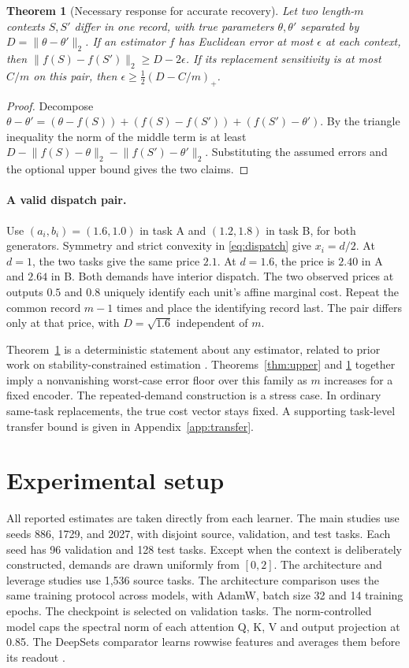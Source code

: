 \documentclass[11pt,letterpaper]{article}
\newtheorem{theorem}{Theorem}
\newcommand{\norm}[1]{\lVert #1\rVert_2}
\begin{document}
\begin{theorem}[Necessary response for accurate recovery]
\label{thm:lower}
Let two length-\(m\) contexts \(S,S'\) differ in one record, with true
parameters \(\theta,\theta'\) separated by \(D=\norm{\theta-\theta'}\).
If an estimator \(f\) has Euclidean error at most \(\epsilon\) at each
context, then \(\norm{f(S)-f(S')}\ge D-2\epsilon\). If its
replacement sensitivity is at most \(C/m\) on this pair, then
\(\epsilon\ge \tfrac12(D-C/m)_+\).
\end{theorem}
\begin{proof}
Decompose \(\theta-\theta'=(\theta-f(S))+(f(S)-f(S'))+
(f(S')-\theta')\). By the triangle inequality the norm of the middle
term is at least \(D-\norm{f(S)-\theta}-\norm{f(S')-\theta'}\).
Substituting the assumed errors and the optional upper bound gives
the two claims.
\end{proof}

\paragraph{A valid dispatch pair.}
Use \((a_i,b_i)=(1.6,1.0)\) in task A and \((1.2,1.8)\) in task B,
for both generators. Symmetry and strict convexity in
\eqref{eq:dispatch} give \(x_i=d/2\). At \(d=1\), the two tasks give
the same price \(2.1\). At \(d=1.6\), the price is \(2.40\) in A
and \(2.64\) in B. Both demands have interior dispatch. The two
observed prices at outputs \(0.5\) and \(0.8\) uniquely identify each
unit's affine marginal cost. Repeat the common record \(m-1\) times
and place the identifying record last. The pair differs only at that
price, with \(D=\sqrt{1.6}\) independent of \(m\).

Theorem~\ref{thm:lower} is a deterministic statement about any estimator,
related to prior work on stability-constrained estimation \cite{clb}.
Theorems~\ref{thm:upper} and \ref{thm:lower} together imply a
nonvanishing worst-case error floor over this family as \(m\) increases
for a fixed encoder. The repeated-demand construction is a stress case.
In ordinary same-task replacements, the true cost vector stays fixed.
A supporting task-level transfer bound is given in Appendix~\ref{app:transfer}.

\clearpage
\section{Experimental setup}
All reported estimates are taken directly from each learner. The main
studies use seeds 886, 1729, and 2027, with disjoint source, validation,
and test tasks. Each seed has 96 validation and 128 test tasks.
Except when the context is deliberately constructed, demands are drawn
uniformly from \([0,2]\). The architecture and leverage studies use
1,536 source tasks. The architecture comparison uses the same training
protocol across models, with AdamW, batch size 32 and 14 training
epochs. The checkpoint is selected on validation tasks. The
norm-controlled model caps the spectral norm of each attention
Q, K, V and output projection at 0.85. The DeepSets comparator learns
rowwise features and averages them before its readout \cite{deepsets}.
\end{document}
